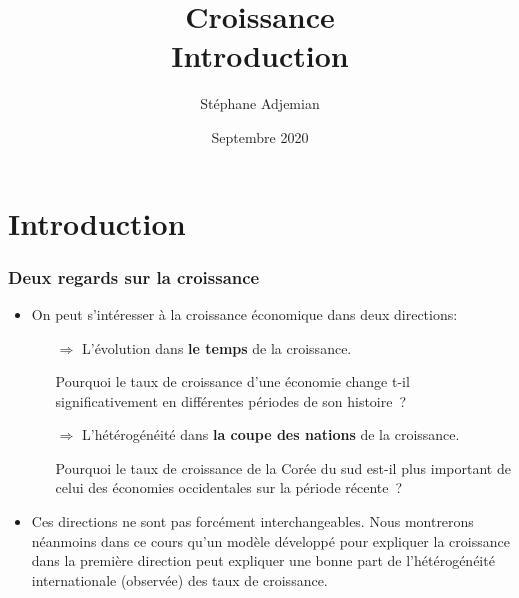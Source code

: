 \documentclass[10pt,notheorems]{beamer}
\theoremstyle{plain}
\theoremstyle{definition} %
\begin{document}
\title{Croissance\\\small{Introduction}}
\author[S. Adjemian]{St\'ephane Adjemian}
\date{Septembre 2020}

\begin{frame}
  \titlepage{}
\end{frame}

\section{Introduction}

\begin{frame}
  \frametitle{Deux regards sur la croissance}
  \begin{itemize}

  \item On peut s'intéresser à la croissance économique dans
    deux directions:

    \bigskip

    \begin{itemize}

    \item[$\Rightarrow$] L'évolution dans \textbf{le temps} de la croissance.\newline

      Pourquoi le taux de croissance d'une économie change t-il significativement en différentes périodes de son histoire~?\newline

    \item[$\Rightarrow$] L'hétérogénéité dans \textbf{la coupe des nations} de la croissance.\newline

      Pourquoi le taux de croissance de la Corée du sud est-il plus important de celui des économies occidentales sur la période récente~?

    \end{itemize}

    \bigskip

  \item Ces directions ne sont pas forcément interchangeables. Nous
    montrerons néanmoins dans ce cours qu'un modèle développé pour expliquer la
    croissance dans la première direction peut expliquer une bonne
    part de l'hétérogénéité internationale (observée) des taux de
    croissance.

  \end{itemize}

\end{frame}
\end{document}
